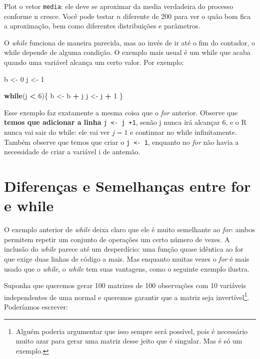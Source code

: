\documentclass[]{book}
\newenvironment{Shaded}{\begin{snugshade}}{\end{snugshade}}
\newcommand{\DecValTok}[1]{\textcolor[rgb]{0.00,0.00,0.81}{#1}}
\newcommand{\StringTok}[1]{\textcolor[rgb]{0.31,0.60,0.02}{#1}}
\newcommand{\ControlFlowTok}[1]{\textcolor[rgb]{0.13,0.29,0.53}{\textbf{#1}}}
\newcommand{\OperatorTok}[1]{\textcolor[rgb]{0.81,0.36,0.00}{\textbf{#1}}}
\newcommand{\NormalTok}[1]{#1}
\let\rmarkdownfootnote\footnote%
\def\footnote{\protect\rmarkdownfootnote}
\begin{document}
Plot o vetor \texttt{media}: ele deve se aproximar da media verdadeira
do processo conforme n cresce. Você pode testar \(n\) diferente de 200
para ver o quão bom fica a aproximação, bem como diferentes
distribuições e parâmetros.

O \emph{while} funciona de maneira parecida, mas ao invés de ir até o
fim do contador, o while depende de alguma condição. O exemplo mais
usual é um while que acaba quando uma variável alcança um certo valor.
Por exemplo:

\begin{Shaded}
\begin{Highlighting}[]
\NormalTok{b <-}\StringTok{ }\DecValTok{0}
\NormalTok{j <-}\StringTok{ }\DecValTok{1}

\ControlFlowTok{while}\NormalTok{(j }\OperatorTok{<}\StringTok{ }\DecValTok{6}\NormalTok{)\{}
\NormalTok{b <-}\StringTok{ }\NormalTok{b }\OperatorTok{+}\StringTok{ }\NormalTok{j}
\NormalTok{j <-}\StringTok{ }\NormalTok{j }\OperatorTok{+}\StringTok{ }\DecValTok{1}
\NormalTok{\}}
\end{Highlighting}
\end{Shaded}

Esse exemplo faz exatamente a mesma coisa que o \emph{for} anterior.
Observe que \textbf{temos que adicionar a linha}
\texttt{j\ \textless{}-\ j\ +1}, senão j nunca irá alcançar 6, e o R
nunca vai sair do while: ele vai ver \(j = 1\) e continuar no while
infinitamente. Também observe que temos que criar o
\texttt{j\ \textless{}-\ 1}, enquanto no \emph{for} não havia a
necessidade de criar a variável i de antemão.

\section{Diferenças e Semelhanças entre for e
while}\label{diferencas-e-semelhancas-entre-for-e-while}

O exemplo anterior de \emph{while} deixa claro que ele é muito
semelhante ao \emph{for}: ambos permitem repetir um conjunto de
operações um certo número de vezes. A inclusão do \emph{while} parece
até um desperdício: uma função quase idêntica ao for que exige duas
linhas de código a mais. Mas enquanto muitas vezes o \emph{for} é mais
usado que o \emph{while}, o \emph{while} tem suas vantagens, como o
seguinte exemplo ilustra.

Suponha que queremos gerar 100 matrizes de 100 observações com 10
variáveis independentes de uma normal e queremos garantir que a matriz
seja invertível\footnote{Alguém poderia argumentar que isso sempre será
  possível, pois é necessário muito azar para gerar uma matriz desse
  jeito que é singular. Mas é só um exemplo.}. Poderíamos escrever:
\end{document}
